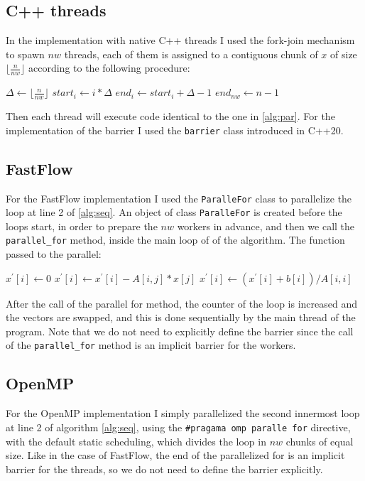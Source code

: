 \documentclass[12pt]{article}
\begin{document}
	\subsection{C++ threads}
	In the implementation with native C++ threads I used the fork-join mechanism to spawn $nw$ threads, each of them is assigned to a contiguous chunk of $x$ of size $\lfloor\frac{n}{nw}\rfloor$ according to the following procedure:
	\begin{algorithmic}
		\State $\Delta \gets \lfloor\frac{n}{nw}\rfloor$
			\State $start_i \gets i*\Delta$
			\State $end_i \gets start_i + \Delta - 1$
		\EndFor
		\State $end_{nw} \gets n-1$
	\end{algorithmic}
	Then each thread will execute code identical to the one in \ref{alg:par}. For the implementation of the barrier I used the \verb*|barrier| class introduced in C++20.
	\subsection{FastFlow}
	For the FastFlow implementation I used the \verb|ParalleFor| class to parallelize the loop at line 2 of \ref{alg:seq}. An object of class \verb|ParalleFor| is created before the loops start, in order to prepare the $nw$ workers in advance, and then we call the \verb*|parallel_for| method, inside the main loop of of the algorithm. The function passed to the parallel:
	\begin{algorithmic}
		\Function{parallel\_for\_iteration}{$i$}
		\State $x^\prime[i] \gets 0$
		\For{$j \gets 0$ to  $n-1$}
		\If{$i \ne j$}
		\State $x^\prime[i] \gets x^\prime[i] - A[i,j]*x[j]$
		\EndIf
		\EndFor
		\State $x^\prime[i] \gets (x^\prime[i] + b[i])/A[i,i]$
		\EndFunction
	\end{algorithmic}
	After the call of the parallel for method, the counter of the loop is increased and the vectors are swapped, and this is done sequentially by the main thread of the program. Note that we do not need to explicitly define the barrier since the call of the \verb*|parallel_for| method is an implicit barrier for the workers. 
	\subsection{OpenMP}
	For the OpenMP implementation I simply parallelized the second innermost loop at line 2 of algorithm \ref{alg:seq}, using the \verb|#pragama omp paralle for| directive, with the default static scheduling, which divides the loop in $nw$ chunks of equal size. Like in the case of FastFlow, the end of the parallelized for is an implicit barrier for the threads, so we do not need to define the barrier explicitly.  
\end{document}
